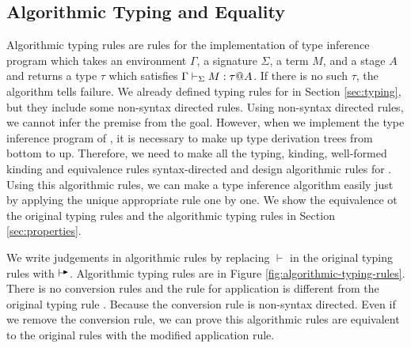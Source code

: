 \subsection{Algorithmic Typing and Equality}


Algorithmic typing rules are rules for the implementation of type inference
program which takes an environment \( \Gamma \), a signature \( \Sigma \), a
term \( M \), and a stage \( A \) and returns a type \( \tau \) which satisfies
\( \Gamma \vdash_\Sigma M : \tau @ A \). If there is no such \( \tau \), the algorithm tells
failure.  We already defined typing rules for \LMD in Section \ref{sec:typing},
but they include some non-syntax directed rules. Using non-syntax directed
rules, we cannot infer the premise from the goal. However, when we implement
the type inference program of \LMD, it is necessary to make up type derivation
trees from bottom to up.  Therefore, we need to make all the typing, kinding,
well-formed kinding and equivalence rules syntax-directed and design
algorithmic rules for \LMD. Using this algorithmic rules, we can
make a type inference algorithm easily just by applying the unique appropriate
rule one by one. We show the equivalence ot the original typing rules and the
algorithmic typing rules in Section \ref{sec:properties}.


We write judgements in algorithmic rules by replacing \( \vdash \) in the
original typing rules with \( \VT \). Algorithmic typing rules are in Figure
\ref{fig:algorithmic-typing-rules}. There is no conversion rules and the rule
for application \TAApp is different from the original typing rule \TApp.
Because the conversion rule is non-syntax directed. Even if we remove the
conversion rule, we can prove this algorithmic rules are equivalent to the
original rules with the modified application rule.

